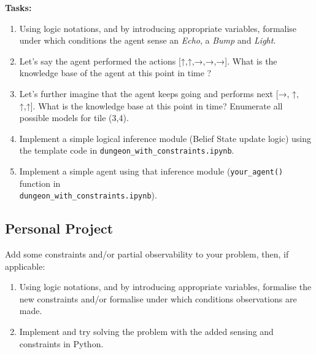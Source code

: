 \documentclass[11pt]{article}
\numberwithin{equation}{section}
\newcommand{\sol}[1]{
    }
\begin{document}
\textbf{Tasks:}
\begin{enumerate}
    \item Using logic notations, and by introducing appropriate variables, formalise under which conditions the agent sense an \emph{Echo}, a \emph{Bump} and \emph{Light}.
    \item Let's say the agent performed the actions [↑,↑,→,→,→]. What is the knowledge base of the agent at this point in time ? 
    
    \sol{
        \paragraph{Knowledge Base}
        \begin{enumerate}
        \item We bumped into a wall after the second action, thus, there is a wall at (0, 2). This also means that we walked the following path: [(0,0), (0,1), (1,1), (2,1), (3,1)].
        \item There were no light at (0,0), (0,1), (1,1), (2,1), thus, $y_S \centernot \in \{0,1,2\}$ and  $x_S \centernot \in \{0, 1\}$.
        \item There were light at (3,1), it could either mean that $x_S =3$ or that $y_S=1$. However, knowing that $y_S \centernot\in \{0, 1\}$, it implies that $x_S=3$.
        \item Upon reaching tile (3,1), we heard an echo. This means that there is a hole either in (3,2), (4,1) or (3,0). (2,1) is not an option since we walked on that tile. 
        (4,1) is not an option either since the hole must be on the same row or column than the stairs, but $x_S\neq 4$ and $y_S \neq 1$.
        \end{enumerate}
    }

    \item Let's further imagine that the agent keeps going and performs next [→, ↑, ↑,↑]. What is the knowledge base at this point in time? Enumerate all possible models for tile (3,4).
    \item Implement a simple logical inference module (Belief State update logic) using the template code in \texttt{dungeon\_with\_constraints.ipynb}.
    \item Implement a simple agent using that inference module (\texttt{your\_agent()} function in \\ \texttt{dungeon\_with\_constraints.ipynb}).
\end{enumerate}

\subsection{Personal Project}

Add some constraints and/or partial observability to your problem, then, if applicable:
\begin{enumerate}
\item Using logic notations, and by introducing appropriate variables, formalise the new constraints and/or formalise under which conditions observations are made. 
\item Implement and try solving the problem with the added sensing and constraints in Python.
\end{enumerate}
\end{document}
